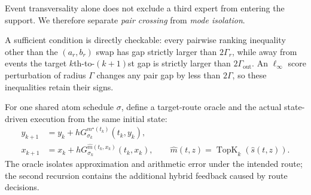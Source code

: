 \documentclass[twoside,11pt]{article}
\newcommand{\norm}[1]{\left\lVert #1\right\rVert}
\newcommand{\TopK}{\operatorname{TopK}}
\begin{document}
Event transversality alone does not exclude a third expert from entering the support.  We therefore separate \emph{pair crossing} from \emph{mode isolation}.


A sufficient condition is directly checkable: every pairwise ranking inequality other than the $(a_r,b_r)$ swap has gap strictly larger than $2\Gamma_r$, while away from events the target $k$th-to-$(k+1)$st gap is strictly larger than $2\Gamma_{\mathrm{out}}$.  An $\ell_\infty$ score perturbation of radius $\Gamma$ changes any pair gap by less than $2\Gamma$, so these inequalities retain their signs.

For one shared atom schedule $\sigma$, define a target-route oracle and the actual state-driven execution from the same initial state:
\begin{align}
 y_{k+1}
 &=y_k+hG_{\sigma_k}^{m^\star(t_k)}(t_k,y_k),
 \label{eq:target-route-oracle-main}\\
 x_{k+1}
 &=x_k+hG_{\sigma_k}^{\widehat m(t_k,x_k)}(t_k,x_k),
 \qquad
 \widehat m(t,z)=\TopK_k(\widehat s(t,z)).
 \label{eq:actual-routed-main}
\end{align}
The oracle isolates approximation and arithmetic error under the intended route; the second recursion contains the additional hybrid feedback caused by route decisions.
\end{document}
